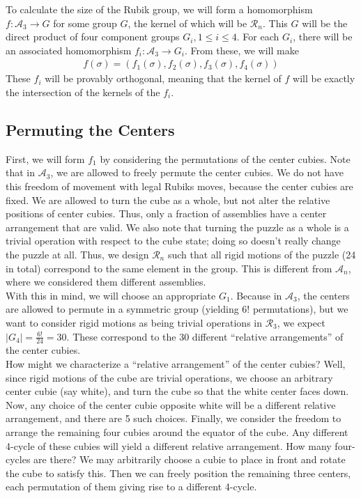 \documentclass[10pt,letterpaper]{report}
\begin{document}
To calculate the size of the Rubik group, we will form a homomorphism $f : \mathcal{A}_3 \rightarrow G$ for some group $G$, the kernel of which will be $\mathcal{R}_n$.  This $G$ will be the direct product of four component groups $G_i, 1 \leq i \leq 4$.  For each $G_i$, there will be an associated homomorphism $f_i : \mathcal{A}_3 \rightarrow G_i$.  From these, we will make \begin{align*}
f(\sigma) = (f_1(\sigma), f_2(\sigma), f_3(\sigma), f_4(\sigma))
\end{align*}
These $f_i$ will be provably orthogonal, meaning that the kernel of $f$ will be exactly the intersection of the kernels of the $f_i$.

\subsection{Permuting the Centers}

First, we will form $f_1$ by considering the permutations of the center cubies.  Note that in $\mathcal{A}_3$, we are allowed to freely permute the center cubies.  We do not have this freedom of movement with legal Rubiks moves, because the center cubies are fixed.  We are allowed to turn the cube as a whole, but not alter the relative positions of center cubies.  Thus, only a fraction of assemblies have a center arrangement that are valid.  We also note that turning the puzzle as a whole is a trivial operation with respect to the cube state; doing so doesn't really change the puzzle at all.  Thus, we design $\mathcal{R}_n$ such that all rigid motions of the puzzle (24 in total) correspond to the same element in the group.  This is different from $\mathcal{A}_n$, where we considered them different assemblies. \\

With this in mind, we will choose an appropriate $G_1$.  Because in $\mathcal{A}_3$, the centers are allowed to permute in a symmetric group (yielding $6!$ permutations), but we want to consider rigid motions as being trivial operations in $\mathcal{R}_3$, we expect $|G_4| = \frac{6!}{24} = 30$.  These correspond to the 30 different ``relative arrangements'' of the center cubies. \\

How might we characterize a ``relative arrangement'' of the center cubies?  Well, since rigid motions of the cube are trivial operations, we choose an arbitrary center cubie (say white), and turn the cube so that the white center faces down.  Now, any choice of the center cubie opposite white will be a different relative arrangement, and there are 5 such choices.  Finally, we consider the freedom to arrange the remaining four cubies around the equator of the cube.  Any different 4-cycle of these cubies will yield a different relative arrangement.  How many four-cycles are there?  We may arbitrarily choose a cubie to place in front and rotate the cube to satisfy this.  Then we can freely position the remaining three centers, each permutation of them giving rise to a different 4-cycle. \\
\end{document}
